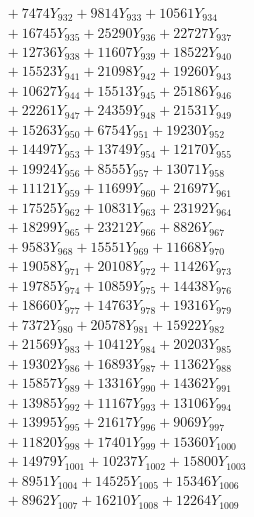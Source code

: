 \documentclass[a4paper,10pt]{article}
\begin{document}
{\begin{align}
&\;  + 7474 Y_{932} + 9814 Y_{933} + 10561 Y_{934} \\[0.3ex]
&\;  + 16745 Y_{935} + 25290 Y_{936} + 22727 Y_{937} \\[0.3ex]
&\;  + 12736 Y_{938} + 11607 Y_{939} + 18522 Y_{940} \\[0.3ex]
&\;  + 15523 Y_{941} + 21098 Y_{942} + 19260 Y_{943} \\[0.3ex]
&\;  + 10627 Y_{944} + 15513 Y_{945} + 25186 Y_{946} \\[0.3ex]
&\;  + 22261 Y_{947} + 24359 Y_{948} + 21531 Y_{949} \\[0.3ex]
&\;  + 15263 Y_{950} + 6754 Y_{951} + 19230 Y_{952} \\[0.3ex]
&\;  + 14497 Y_{953} + 13749 Y_{954} + 12170 Y_{955} \\[0.3ex]
&\;  + 19924 Y_{956} + 8555 Y_{957} + 13071 Y_{958} \\[0.5ex]\allowbreak
&\;  + 11121 Y_{959} + 11699 Y_{960} + 21697 Y_{961} \\[0.3ex]
&\;  + 17525 Y_{962} + 10831 Y_{963} + 23192 Y_{964} \\[0.3ex]
&\;  + 18299 Y_{965} + 23212 Y_{966} + 8826 Y_{967} \\[0.3ex]
&\;  + 9583 Y_{968} + 15551 Y_{969} + 11668 Y_{970} \\[0.3ex]
&\;  + 19058 Y_{971} + 20108 Y_{972} + 11426 Y_{973} \\[0.3ex]
&\;  + 19785 Y_{974} + 10859 Y_{975} + 14438 Y_{976} \\[0.3ex]
&\;  + 18660 Y_{977} + 14763 Y_{978} + 19316 Y_{979} \\[0.3ex]
&\;  + 7372 Y_{980} + 20578 Y_{981} + 15922 Y_{982} \\[0.3ex]
&\;  + 21569 Y_{983} + 10412 Y_{984} + 20203 Y_{985} \\[0.3ex]
&\;  + 19302 Y_{986} + 16893 Y_{987} + 11362 Y_{988} \\[0.5ex]\allowbreak
&\;  + 15857 Y_{989} + 13316 Y_{990} + 14362 Y_{991} \\[0.3ex]
&\;  + 13985 Y_{992} + 11167 Y_{993} + 13106 Y_{994} \\[0.3ex]
&\;  + 13995 Y_{995} + 21617 Y_{996} + 9069 Y_{997} \\[0.3ex]
&\;  + 11820 Y_{998} + 17401 Y_{999} + 15360 Y_{1000} \\[0.3ex]
&\;  + 14979 Y_{1001} + 10237 Y_{1002} + 15800 Y_{1003} \\[0.3ex]
&\;  + 8951 Y_{1004} + 14525 Y_{1005} + 15346 Y_{1006} \\[0.3ex]
&\;  + 8962 Y_{1007} + 16210 Y_{1008} + 12264 Y_{1009} \\[0.3ex]

\end{align}}
\end{document}
